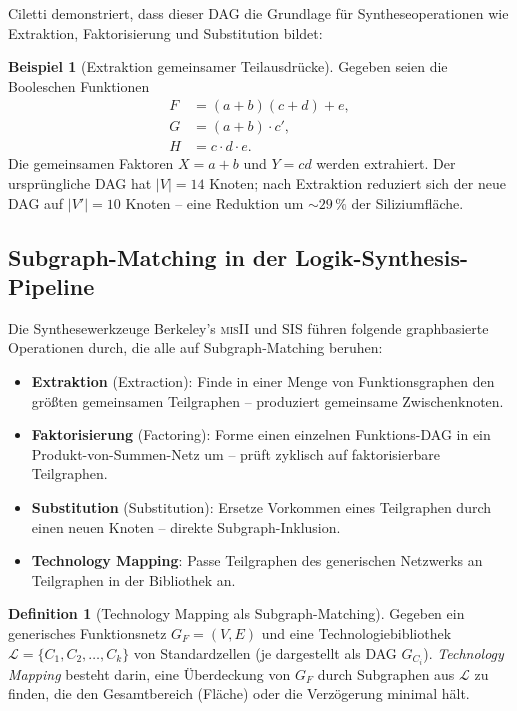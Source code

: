 ﻿\documentclass[a4paper,12pt]{article}
\theoremstyle{definition}
\newtheorem{definition}{Definition}
\newtheorem{beispiel}{Beispiel}
\begin{document}
Ciletti \cite[S.~238,\,Beispiel~6.2]{ciletti2011} demonstriert, dass dieser DAG die
Grundlage für Syntheseoperationen wie Extraktion, Faktorisierung und Substitution bildet:

\begin{beispiel}[Extraktion gemeinsamer Teilausdrücke]\label{bsp:extraktion}
  Gegeben seien die Booleschen Funktionen
  \begin{align*}
    F &= (a + b)(c + d) + e, \\
    G &= (a + b) \cdot c', \\
    H &= c \cdot d \cdot e.
  \end{align*}
  Die gemeinsamen Faktoren $X = a + b$ und $Y = cd$ werden extrahiert. Der ursprüngliche
  DAG hat $|V| = 14$ Knoten; nach Extraktion reduziert sich der neue DAG auf $|V'| = 10$
  Knoten -- eine Reduktion um $\sim 29\,\%$ der Siliziumfläche.
\end{beispiel}

\subsection{Subgraph-Matching in der Logik-Synthesis-Pipeline}

Die Synthesewerkzeuge Berkeley's \textsc{misII} und \textsc{SIS} \cite{brayton1987mis}
führen folgende graphbasierte Operationen durch, die alle auf Subgraph-Matching beruhen:

\begin{itemize}
  \item \textbf{Extraktion} (Extraction): Finde in einer Menge von Funktionsgraphen den
        größten gemeinsamen Teilgraphen -- produziert gemeinsame Zwischenknoten.
  \item \textbf{Faktorisierung} (Factoring): Forme einen einzelnen Funktions-DAG in ein
        Produkt-von-Summen-Netz um -- prüft zyklisch auf faktorisierbare Teilgraphen.
  \item \textbf{Substitution} (Substitution): Ersetze Vorkommen eines Teilgraphen durch
        einen neuen Knoten -- direkte Subgraph-Inklusion.
  \item \textbf{Technology Mapping}: Passe Teilgraphen des generischen Netzwerks an
        Teilgraphen in der Bibliothek an.
\end{itemize}

\begin{definition}[Technology Mapping als Subgraph-Matching]
  Gegeben ein generisches Funktionsnetz $G_F = (V, E)$ und eine Technologiebibliothek
  $\mathcal{L} = \{C_1, C_2, \ldots, C_k\}$ von Standardzellen (je dargestellt als DAG
  $G_{C_i}$). \emph{Technology Mapping} besteht darin, eine Überdeckung von $G_F$ durch
  Subgraphen aus $\mathcal{L}$ zu finden, die den Gesamtbereich (Fläche) oder die
  Verzögerung minimal hält.
\end{definition}
\end{document}
